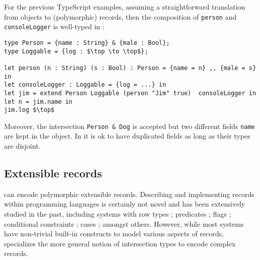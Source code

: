 For the previous TypeScript examples, assuming a straightforward
translation from objects to (polymorphic) records, then the
composition of \lstinline{person} and \lstinline{consoleLogger} is
well-typed in \name:

\begin{lstlisting}[mathescape=true]
type Person = {name : String} & {male : Bool};
type Loggable = {log : $\top \to \top$};

let person (n : String) (s : Bool) : Person = {name = n} ,, {male = s} in
let consoleLogger : Loggable = {log = ...} in
let jim = extend Person Loggable (person "Jim" true)  consoleLogger in
let n = jim.name in
jim.log $\top$
\end{lstlisting}

Moreover, the intersection \lstinline$Person & Dog$ is accepted but
two different fields \lstinline$name$ are kept in the object. In \name
it is ok to have duplicated fields as long as their types are
disjoint. 

\subsection{Extensible records}
\name can encode polymorphic extensible records. Describing and
implementing records within programming languages is certainly not
novel and has been extensively studied in the past, including
systems with row types \cite{wand1987complete,wand1989type}; 
predicates \cite{harper1990extensible,harper1991record,gaster1996polymorphic}; 
flags \cite{remy1993type}; conditional constraints \cite{pottier2003constraint};
cases \cite{blume2006extensible}; amongst others. However, while 
most systems have non-trivial built-in constructs to model various aspects of
records, \name specializes the more general notion of intersection
types to encode complex records.


